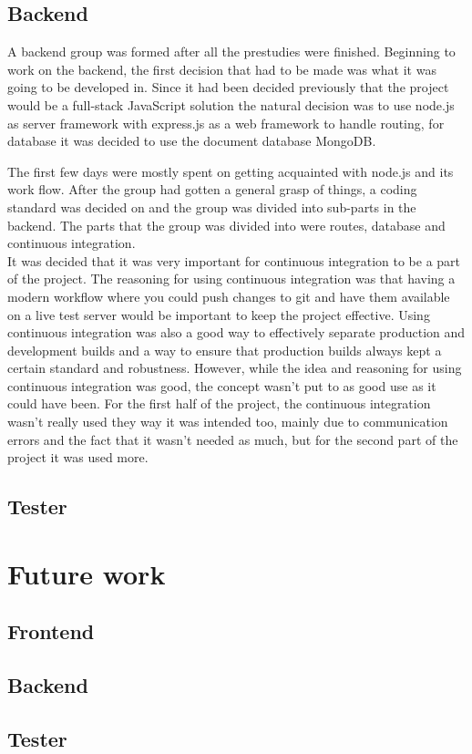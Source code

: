 \documentclass[a4paper,12pt]{article}
\begin{document}
\subsection{Backend}
A backend group was formed after all the prestudies were finished.
Beginning to work on the backend, the first decision that had to be made was what it was going to be developed in. Since it had been decided previously that the project would be a full-stack JavaScript solution the natural decision was to use node.js as server framework with express.js as a web framework to handle routing, for database it was decided to use the document database MongoDB.

The first few days were mostly spent on getting acquainted with node.js and its work flow.
After the group had gotten a general grasp of things, a coding standard was decided on and the group was divided into sub-parts in the backend.
The parts that the group was divided into were routes, database and continuous integration.
\\
It was decided that it was very important for continuous integration to be a part of the project. The reasoning for using continuous integration was that having a modern workflow where you could push changes to git and have them available on a live test server would be important to keep the project effective. Using continuous integration was also a good way to effectively separate production and development builds and a way to ensure that production builds always kept a certain standard and robustness.
However, while the idea and reasoning for using continuous integration was good, the concept wasn't put to as good use as it could have been. For the first half of the project, the continuous integration wasn't really used they way it was intended too, mainly due to communication errors and the fact that it wasn't needed as much, but for the second part of the project it was used more.

\subsection{Tester}

\section{Future work}
\subsection{Frontend}
\subsection{Backend}
\subsection{Tester}
\end{document}
